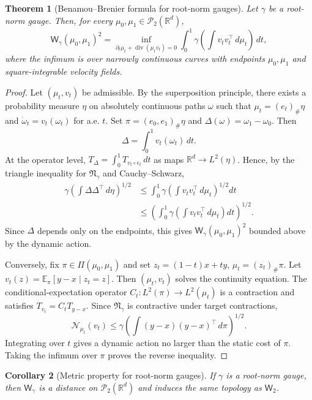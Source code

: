 \documentclass{article}
\newtheorem{theorem}{Theorem}[section]
\newtheorem{corollary}[theorem]{Corollary}
\newcommand{\R}{\mathbb{R}}
\newcommand{\cP}{\mathcal{P}}
\newcommand{\MN}{\mathcal{N}}
\newcommand{\Wtwo}{\mathsf{W}_2}
\newcommand{\Wg}{\mathsf{W}_{\gamma}}
\newcommand{\divv}{\operatorname{div}}
\begin{document}
\begin{theorem}[Benamou--Brenier formula for root-norm gauges]
\label{thm:root-norm-bb}
Let $\gamma$ be a root-norm gauge.  Then, for every
$\mu_0,\mu_1\in\cP_2(\R^d)$,
$$
    \Wg(\mu_0,\mu_1)^2
    =
    \inf_{\partial_t\mu_t+\divv(\mu_tv_t)=0}
    \int_0^1
    \gamma\!\left(\int v_t v_t^\top\,d\mu_t\right)\,dt,
$$
where the infimum is over narrowly continuous curves with endpoints
$\mu_0,\mu_1$ and square-integrable velocity fields.
\end{theorem}

\begin{proof}
Let $(\mu_t,v_t)$ be admissible. By the superposition principle, there exists
a probability measure $\eta$ on absolutely continuous paths $\omega$ such
that $\mu_t=(e_t)_\#\eta$ and
$\dot\omega_t=v_t(\omega_t)$ for a.e. $t$. Set
$\pi=(e_0,e_1)_\#\eta$ and $\Delta(\omega)=\omega_1-\omega_0$. Then
$$
    \Delta=\int_0^1 v_t(\omega_t)\,dt.
$$
At the operator level,
$T_\Delta=\int_0^1 T_{v_t\circ e_t}\,dt$ as maps
$\R^d\to L^2(\eta)$.  Hence, by the triangle inequality for
$\mathfrak N_\gamma$ and Cauchy--Schwarz,
$$
\begin{aligned}
    \gamma\!\left(\int \Delta\Delta^\top\,d\eta\right)^{1/2}
    &\le
    \int_0^1
    \gamma\!\left(\int v_t v_t^\top\,d\mu_t\right)^{1/2}dt  \\
    &\le
    \left(
    \int_0^1
    \gamma\!\left(\int v_t v_t^\top\,d\mu_t\right)dt
    \right)^{1/2}.
\end{aligned}
$$
Since $\Delta$ depends only on the endpoints, this gives
$\Wg(\mu_0,\mu_1)^2$ bounded above by the dynamic action.

Conversely, fix $\pi\in\Pi(\mu_0,\mu_1)$ and set
$z_t=(1-t)x+ty$, $\mu_t=(z_t)_\#\pi$.  Let
$v_t(z)=\mathbb E_\pi[y-x\mid z_t=z]$.  Then
$(\mu_t,v_t)$ solves the continuity equation. The conditional-expectation
operator $C_t:L^2(\pi)\to L^2(\mu_t)$ is a contraction and satisfies
$T_{v_t}=C_tT_{y-x}$. Since $\mathfrak N_\gamma$ is contractive under target
contractions,
$$
    \MN_{\mu_t}(v_t)
    \le
    \gamma\!\left(\int (y-x)(y-x)^\top\,d\pi\right)^{1/2}.
$$
Integrating over $t$ gives a dynamic action no larger than the static cost of
$\pi$.  Taking the infimum over $\pi$ proves the reverse inequality.
\end{proof}

\begin{corollary}[Metric property for root-norm gauges]
\label{cor:root-norm-metric}
If $\gamma$ is a root-norm gauge, then $\Wg$ is a distance on
$\cP_2(\R^d)$ and induces the same topology as $\Wtwo$.
\end{corollary}
\end{document}
